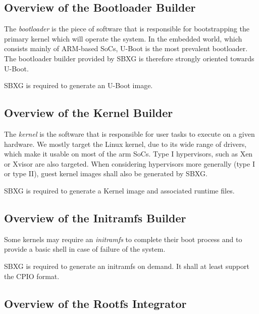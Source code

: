 \documentclass{article}
\begin{document}
\subsection{Overview of the Bootloader Builder}

The \emph{bootloader} is the piece of software that is responsible for
bootstrapping the primary kernel which will operate the system. In the embedded
world, which consists mainly of ARM-based SoCs, U-Boot is the most prevalent
bootloader. The bootloader builder provided by SBXG is therefore strongly
oriented towards U-Boot.

\begin{requirement}
SBXG is required to generate an U-Boot image.
\end{requirement}


\subsection{Overview of the Kernel Builder}

The \emph{kernel} is the software that is responsible for user tasks to execute
on a given hardware. We mostly target the Linux kernel, due to its wide range of
drivers, which make it usable on most of the arm SoCs.
Type I hypervisors, such as Xen or Xvisor are also targeted. When considering
hypervisors more generally (type I or type II), guest kernel images shall also
be generated by SBXG.

\begin{requirement}
SBXG is required to generate a Kernel image and associated runtime files.
\end{requirement}

\subsection{Overview of the Initramfs Builder}

Some kernels may require an \emph{initramfs} to complete their boot process and
to provide a basic shell in case of failure of the system.

\begin{requirement}
SBXG is required to generate an initramfs on demand. It shall at least support
the CPIO format.
\end{requirement}

\subsection{Overview of the Rootfs Integrator}
\end{document}
